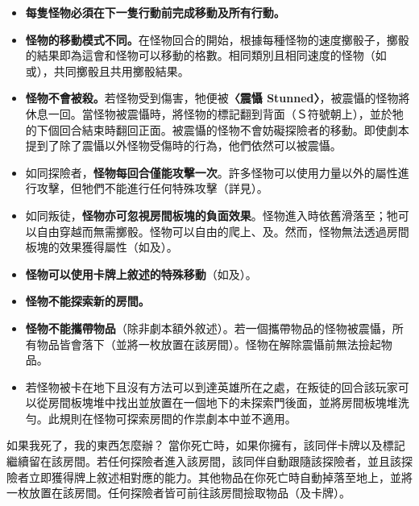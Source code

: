\begin{itemize}
  \item \textbf{每隻怪物必須在下一隻行動前完成移動及所有行動。}
  \item \textbf{怪物的移動模式不同。}在怪物回合的開始，根據每種怪物的速度擲骰子，擲骰的結果即為這會和怪物可以移動的格數。相同類別且相同速度的怪物（如或），共同擲骰且共用擲骰結果。
  \item \textbf{怪物不會被殺。}若怪物受到傷害，牠便被\textbf{〈震懾 Stunned〉}，被震懾的怪物將休息一回。當怪物被震懾時，將怪物的標記翻到背面（Ｓ符號朝上），並於牠的下個回合結束時翻回正面。被震懾的怪物不會妨礙探險者的移動。即使劇本提到了除了震懾以外怪物受傷時的行為，他們依然可以被震懾。
  \item 如同探險者，\textbf{怪物每回合僅能攻擊一次}。許多怪物可以使用力量以外的屬性進行攻擊，但牠們不能進行任何特殊攻擊（詳見）。
  \item 如同叛徒，\textbf{怪物亦可忽視房間板塊的負面效果}。怪物進入時依舊滑落至；牠可以自由穿越而無需擲骰。怪物可以自由的爬上、及。然而，怪物無法透過房間板塊的效果獲得屬性（如及）。
  \item \textbf{怪物可以使用卡牌上敘述的特殊移動}（如及）。
  \item \textbf{怪物不能探索新的房間。}
  \item \textbf{怪物不能攜帶物品}（除非劇本額外敘述）。若一個攜帶物品的怪物被震懾，所有物品皆會落下（並將一枚放置在該房間）。怪物在解除震懾前無法撿起物品。
  \item 若怪物被卡在地下且沒有方法可以到達英雄所在之處，在叛徒的回合該玩家可以從房間板塊堆中找出並放置在一個地下的未探索門後面，並將房間板塊堆洗勻。此規則在怪物可探索房間的作祟劇本中並不適用。
\end{itemize}

\begin{RuleBox}{如果我死了，我的東西怎麼辦？}
  當你死亡時，如果你擁有，該同伴卡牌以及標記繼續留在該房間。若任何探險者進入該房間，該同伴自動跟隨該探險者，並且該探險者立即獲得牌上敘述相對應的能力。其他物品在你死亡時自動掉落至地上，並將一枚放置在該房間。任何探險者皆可前往該房間撿取物品（及卡牌）。
\end{RuleBox}
